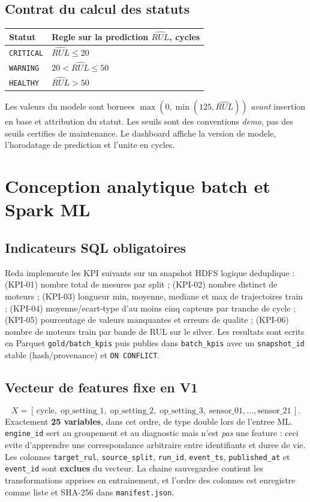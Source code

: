 \documentclass[10pt,a4paper]{article}
\newcommand{\code}[1]{{\small\ttfamily\nolinkurl{#1}}}
\begin{document}
\subsection{Contrat du calcul des statuts}
\begin{tabularx}{\linewidth}{@{}p{30mm}Y@{}}
\toprule
\textbf{Statut} & \textbf{Regle sur la prediction \(\widehat{RUL}\), cycles}\\\midrule
\code{CRITICAL} & \(\widehat{RUL}\le 20\)\\
\code{WARNING} & \(20 < \widehat{RUL}\le 50\)\\
\code{HEALTHY} & \(\widehat{RUL}>50\)\\
\bottomrule
\end{tabularx}
Les valeurs du modele sont bornees \(\max(0,\min(125,\widehat{RUL}))\) \emph{avant} insertion en base et attribution du statut. Les seuils sont des conventions \emph{demo}, pas des seuils certifies de maintenance. Le dashboard affiche la version de modele, l'horodatage de prediction et l'unite en cycles.

\section{Conception analytique batch et Spark ML}
\subsection{Indicateurs SQL obligatoires}
Reda implemente les KPI suivants sur un snapshot HDFS logique deduplique : (KPI-01) nombre total de mesures par split ; (KPI-02) nombre distinct de moteurs ; (KPI-03) longueur min, moyenne, mediane et max de trajectoires train ; (KPI-04) moyenne/ecart-type d'au moins cinq capteurs par tranche de cycle ; (KPI-05) pourcentage de valeurs manquantes et erreurs de qualite ; (KPI-06) nombre de moteurs train par bande de RUL sur le silver. Les resultats sont ecrits en Parquet \code{gold/batch_kpis} puis publies dans \code{batch_kpis} avec un \code{snapshot_id} stable (hash/provenance) et \code{ON CONFLICT}.

\subsection{Vecteur de features fixe en V1}
\[
X= [\,\mathrm{cycle},\;\mathrm{op\_setting\_1},\;\mathrm{op\_setting\_2},\;\mathrm{op\_setting\_3},\;\mathrm{sensor\_01},\ldots,\mathrm{sensor\_21}\,].
\]
Exactement \textbf{25 variables}, dans cet ordre, de type double lors de l'entree ML. \code{engine_id} sert au groupement et au diagnostic mais n'est \emph{pas} une feature : ceci evite d'apprendre une correspondance arbitraire entre identifiants et duree de vie. Les colonnes \code{target_rul}, \code{source_split}, \code{run_id}, \code{event_ts}, \code{published_at} et \code{event_id} sont \textbf{exclues} du vecteur. La chaine sauvegardee contient les transformations apprises en entrainement, et l'ordre des colonnes est enregistre comme liste et SHA-256 dans \code{manifest.json}.
\end{document}
